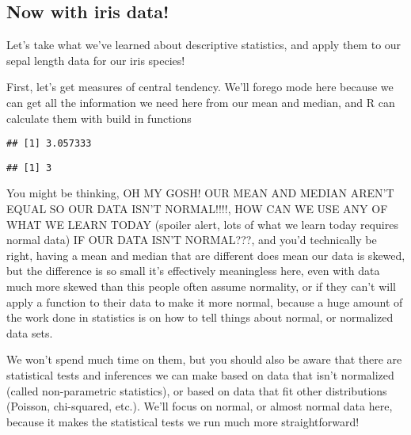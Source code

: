 \documentclass[
]{article}
\newenvironment{Shaded}{\begin{snugshade}}{\end{snugshade}}
\newcommand{\CommentTok}[1]{\textcolor[rgb]{0.56,0.35,0.01}{\textit{#1}}}
\newcommand{\KeywordTok}[1]{\textcolor[rgb]{0.13,0.29,0.53}{\textbf{#1}}}
\newcommand{\NormalTok}[1]{#1}
\newcommand{\OperatorTok}[1]{\textcolor[rgb]{0.81,0.36,0.00}{\textbf{#1}}}
\begin{document}
\hypertarget{now-with-iris-data}{%
\subsection{Now with iris data!}\label{now-with-iris-data}}

Let's take what we've learned about descriptive statistics, and apply
them to our sepal length data for our iris species!

First, let's get measures of central tendency. We'll forego mode here
because we can get all the information we need here from our mean and
median, and R can calculate them with build in functions

\begin{Shaded}
\end{Shaded}

\begin{verbatim}
## [1] 3.057333
\end{verbatim}

\begin{Shaded}
\end{Shaded}

\begin{verbatim}
## [1] 3
\end{verbatim}

You might be thinking, OH MY GOSH! OUR MEAN AND MEDIAN AREN'T EQUAL SO
OUR DATA ISN'T NORMAL!!!!, HOW CAN WE USE ANY OF WHAT WE LEARN TODAY
(spoiler alert, lots of what we learn today requires normal data) IF OUR
DATA ISN'T NORMAL???, and you'd technically be right, having a mean and
median that are different does mean our data is skewed, but the
difference is so small it's effectively meaningless here, even with data
much more skewed than this people often assume normality, or if they
can't will apply a function to their data to make it more normal,
because a huge amount of the work done in statistics is on how to tell
things about normal, or normalized data sets.

We won't spend much time on them, but you should also be aware that
there are statistical tests and inferences we can make based on data
that isn't normalized (called non-parametric statistics), or based on
data that fit other distributions (Poisson, chi-squared, etc.). We'll
focus on normal, or almost normal data here, because it makes the
statistical tests we run much more straightforward!
\end{document}

